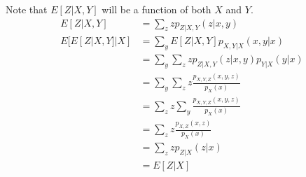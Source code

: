 \documentclass[../../probability-notes.tex]{subfile}
\begin{document}
        Note that $E[Z|X,Y]$ will be a function of both $X$ and $Y$.
        \begin{align*}
            E[Z|X,Y] &= \sum_{z} z p_{Z|X,Y}(z|x,y)\\
            E[E[Z|X,Y]|X] &= \sum_{y} E[Z|X,Y]p_{X,Y|X}(x,y|x)\\
                        &= \sum_{y} \sum_{z} z p_{Z|X,Y}(z|x,y) p_{Y|X}(y|x)\\
                        &= \sum_{y} \sum_{z} z \frac{p_{X,Y,Z}(x,y,z)}{p_{X}(x)}\\
                        &= \sum_{z} z \sum_{y} \frac{p_{X,Y,Z}(x,y,z)}{p_{X}(x)}\\
                        &= \sum_{z} z \frac{p_{X,Z}(x,z)}{p_{X}(x)}\\
                        &= \sum_{z} z p_{Z|X}(z|x)\\
                        &= E[Z|X]
        \end{align*}
\end{document}
